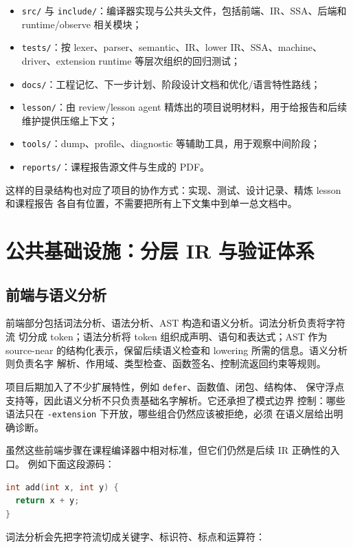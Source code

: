 \documentclass[UTF8,a4paper,11pt]{ctexart}
\begin{document}
\begin{itemize}
  \item \texttt{src/} 与 \texttt{include/}：编译器实现与公共头文件，包括前端、IR、SSA、后端和 runtime/observe 相关模块；
  \item \texttt{tests/}：按 lexer、parser、semantic、IR、lower IR、SSA、machine、driver、extension runtime 等层次组织的回归测试；
  \item \texttt{docs/}：工程记忆、下一步计划、阶段设计文档和优化/语言特性路线；
  \item \texttt{lesson/}：由 review/lesson agent 精炼出的项目说明材料，用于给报告和后续维护提供压缩上下文；
  \item \texttt{tools/}：dump、profile、diagnostic 等辅助工具，用于观察中间阶段；
  \item \texttt{reports/}：课程报告源文件与生成的 PDF。
\end{itemize}

这样的目录结构也对应了项目的协作方式：实现、测试、设计记录、精炼 lesson 和课程报告
各自有位置，不需要把所有上下文集中到单一总文档中。

\section{公共基础设施：分层 IR 与验证体系}

\subsection{前端与语义分析}

前端部分包括词法分析、语法分析、AST 构造和语义分析。词法分析负责将字符流
切分成 token；语法分析将 token 组织成声明、语句和表达式；AST 作为 source-near
的结构化表示，保留后续语义检查和 lowering 所需的信息。语义分析则负责名字
解析、作用域、类型检查、函数签名、控制流返回约束等规则。

项目后期加入了不少扩展特性，例如 \texttt{defer}、函数值、闭包、结构体、
保守浮点支持等，因此语义分析不只负责基础名字解析。它还承担了模式边界
控制：哪些语法只在 \texttt{-extension} 下开放，哪些组合仍然应该被拒绝，必须
在语义层给出明确诊断。

虽然这些前端步骤在课程编译器中相对标准，但它们仍然是后续 IR 正确性的入口。
例如下面这段源码：

\begin{lstlisting}[language=C]
int add(int x, int y) {
  return x + y;
}
\end{lstlisting}

词法分析会先把字符流切成关键字、标识符、标点和运算符：
\end{document}
